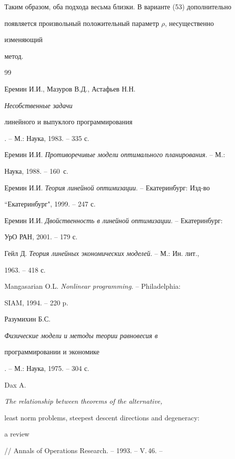 Таким образом, оба подхода весьма близки. В варианте (53) дополнительно


появляется произвольный положительный параметр $\rho$, несущественно 


изменяющий


метод.





\begin{thebibliography}{99}







Еремин И.И., Мазуров В.Д., Астафьев Н.Н. {\em Несобственные задачи


линейного и выпуклого программирования}. -- М.: Наука, 1983. -- 335 с.




Еремин И.И. {\em Противоречивые модели оптимального планирования}. -- М.:


Наука, 1988. -- 160~с.




Еремин И.И. {\em Теория линейной оптимизации}. -- Екатеринбург: Изд-во


``Екатеринбург", 1999. -- 247 с.




Еремин И.И. {\em Двойственность в линейной оптимизации}. -- Екатеринбург:


УрО РАН, 2001. -- 179 с.




Гейл Д. {\em Теория линейных экономических моделей}. -- М.: Ин. лит.,


1963. -- 418 с.




Mangasarian O.L. {\em Nonlinear programming}. -- Philadelphia:


SIAM, 1994. -- 220 p.




Разумихин Б.С. {\em Физические модели и методы теории равновесия в


программировании и экономике}. -- М.: Наука, 1975. -- 304 с.




Dax A. {\em The relationship between theorems of the alternative,


least norm problems, steepest descent directions and degeneracy$:$


a review} // Annals of Operations Research. -- 1993. -- V.\,46. --



\end{thebibliography}
